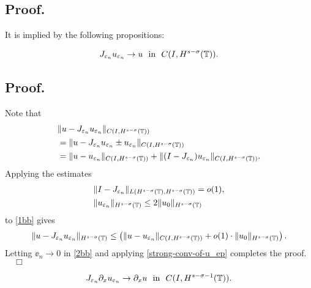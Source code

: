 \subsection{Proof.} It is implied by the following propositions:
\begin{proposition}
\label{prop:1aa}
\begin{equation}
\begin{split}
J_{\varepsilon_n} u_{\varepsilon_n} \to  u \ \ \text{in} \ \
C(I, H^{s-\sigma}(\mathbb{T})).
\label{}
\end{split}
\end{equation}
\end{proposition}
\subsection{Proof.} Note that
\begin{equation}
\begin{split}
& \| u -  J_{\varepsilon_n} u_{\varepsilon_n}
\|_{C(I, H^{s-\sigma}(\mathbb{T}))}
\\
&= \| u -  J_{\varepsilon_n} u_{\varepsilon_n} \pm 
u_{\varepsilon_n} \|_{C(I, H^{s-\sigma}(\mathbb{T}))}
\\
& = \| u -  u_{\varepsilon_n}
\|_{C(I,H^{s-\sigma}(\mathbb{T}))} + \| (I - J_{\varepsilon_n})
u_{\varepsilon_n} \|_{C(I, H^{s-\sigma}(\mathbb{T}))}.
\label{1bb}
\end{split}
\end{equation}
Applying the estimates
\begin{equation*}
\begin{split}
& \|I-J_{\varepsilon_n} \|_{L(H^{s-\sigma}(\mathbb{T}), H^{s -
\sigma}(\mathbb{T}))} = o(1),
\\
& \|u_{\varepsilon_n}\|_{H^{s-\sigma}(\mathbb{T})} \le 2
\|u_0\|_{H^{s-\sigma}(\mathbb{T})}
\end{split}
\end{equation*}
to \eqref{1bb} gives
\begin{equation}
\label{2bb}
\begin{split}
\| u -  J_{\varepsilon_n} u_{\varepsilon_n}\|_{H^{s-\sigma}(\mathbb{T})}
\le \left( \| u -  u_{\varepsilon_n}
\|_{C(I, H^{s-\sigma}(\mathbb{T}))} + o(1) \cdot \|u_0
\|_{H^{s-\sigma}(\mathbb{T})} \right).
\end{split}
\end{equation}
Letting $\ee_n \to 0$ in \eqref{2bb} and applying
\eqref{strong-conv-of-u_ep} completes the proof. $\quad \Box$
%
%
\begin{proposition}
\label{prop:dd}
\begin{equation}
\begin{split}
J_{\varepsilon_n} \partial_x u_{\varepsilon_n} \to  \partial_x u \ \
\text{in} \ \ C(I, H^{s-\sigma-1}(\mathbb{T})).
\label{0dd}
\end{split}
\end{equation}
\end{proposition}
